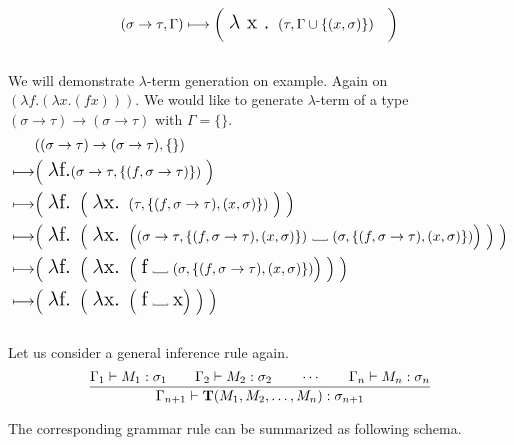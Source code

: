 \documentclass[12pt,a4paper]{report}
\newcommand{\Lets}{Let us\xspace}
\newcommand{\lterm}{$\lambda$-term\xspace}
\newcommand{\tur}[3]{#1\vdash{}#2:#3}
\newcommand\Vtextvisiblespace[1][.3em]{%
  \mbox{\kern.06em\vrule height.3ex}%
  \vbox{\hrule width#1}%
  \hbox{\vrule height.3ex}}
\begin{document}

$$ 
	( \sigma \rightarrow \tau , \Gamma )  \longmapsto
	\bigg( \mbox{ {\Large $\lambda$ x . }}( \tau , \Gamma \cup \{ (x,\sigma) \} ) \quad \bigg)
$$\\

We will demonstrate \lterm generation on example. 
Again on $(\lambda f . (\lambda x . (f x) ))$. 
We would like to generate \lterm of a type 
$(\sigma \rightarrow \tau) \rightarrow (\sigma \rightarrow \tau)$
with $\Gamma = \{\}$.
\begin{align*}
	& ((\sigma \rightarrow \tau) \rightarrow (\sigma \rightarrow \tau),\{\}) \\ 
	\gar & \Big( \mbox{ {\Large $\lambda$f.}}
	  ( \sigma \rightarrow \tau , \{ (f,\sigma \rightarrow \tau) \} ) 
	~ \Big)
	\\
	\gar & 
	\Big( \mbox{ {\Large $\lambda$f. }}
		\Big( \mbox{ {\Large $\lambda$x. }}
	  	 	( \tau , \{ (f,\sigma \rightarrow \tau) , (x,\sigma) \} ) 
		~ \Big)  	 
	~ \Big)
	\\
	\gar & 
	\Big( \mbox{ {\Large $\lambda$f. }}
		\Big( \mbox{ {\Large $\lambda$x. }}	  	 	
	  	 	\Big( 
	  	 	  ( \sigma \rightarrow \tau , \{ (f,\sigma \rightarrow \tau) , (x,\sigma) \} ) 
			  \mbox{ \Vtextvisiblespace[1em] } 
			  ( \sigma , \{ (f,\sigma \rightarrow \tau) , (x,\sigma) \} )  \Big) 
		~ \Big)  	 
	 ~ \Big)
	\\
	\gar & 
	\Big( \mbox{ {\Large $\lambda$f. }}
		\Big( \mbox{ {\Large $\lambda$x. }}	  	 	
	  	 	\Big( 
	  	 	  \mbox{ {\Large f}} 
			  \mbox{ \Vtextvisiblespace[1em] } 
			  ( \sigma , \{ (f,\sigma \rightarrow \tau) , (x,\sigma) \} ) \Big) 
		~ \Big)  	 
	~ \Big)		
	\\
	\gar & 
	\Big( \mbox{ {\Large $\lambda$f. }}
		\Big( \mbox{ {\Large $\lambda$x. }}	  	 	
	  	 	\Big( 
	  	 	  \mbox{ {\Large f}} 
			  \mbox{ \Vtextvisiblespace[1em] } 
			  \mbox{{\Large x}} \Big) 
		~ \Big)  	 
	~ \Big)
\end{align*}~\\


\Lets consider a general inference rule again.
$$ 
\ruleIV
  { \tur{\Gamma_1}{M_1}{\sigma_1} }
  { \tur{\Gamma_2}{M_2}{\sigma_2} }
  { \dotsm }
  { \tur{\Gamma_n}{M_n}{\sigma_n} }
  { \tur{\Gamma_{n+1}}{ \mathbf{T}(M_1,M_2,\dots,M_n)}{\sigma_{n+1}} } 
$$

The corresponding grammar rule can be summarized as following schema.
\end{document}
